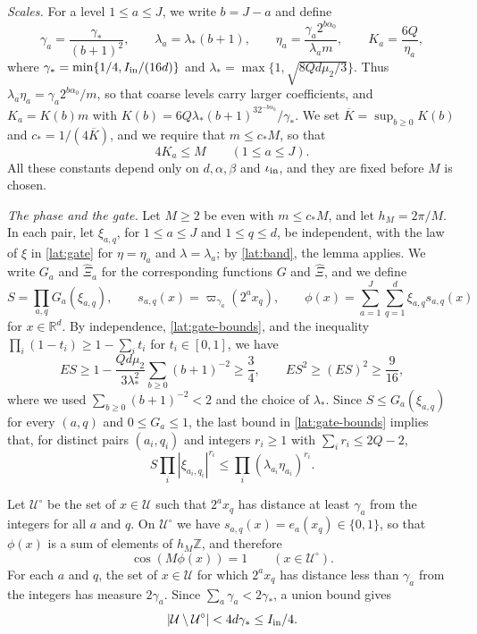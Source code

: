 \emph{Scales.} For a level $1\le a\le J$, we write $b=J-a$ and define
\[
 \gamma_a=\frac{\gamma_*}{(b+1)^2},\qquad
 \lambda_a=\lambda_*(b+1),\qquad
 \eta_a=\frac{\gamma_a2^{b\alpha_0}}{\lambda_am},\qquad
 K_a=\frac{6Q}{\eta_a},
\]
where $\gamma_*=\min\{1/4,I_{\rm in}/(16d)\}$ and
$\lambda_*=\max\{1,\sqrt{8Qd\mu_2/3}\}$. Thus
$\lambda_a\eta_a=\gamma_a2^{b\alpha_0}/m$, so that coarse levels carry
larger coefficients, and $K_a=K(b)m$ with
$K(b)=6Q\lambda_*(b+1)^32^{-b\alpha_0}/\gamma_*$. We set
$\overline K=\sup_{b\ge0}K(b)$ and $c_*=1/(4\overline K)$, and we
require that $m\le c_*M$, so that
\begin{equation}\label{lat:band}
 4K_a\le M\qquad(1\le a\le J).
\end{equation}
All these constants depend only on $d,\alpha,\beta$ and
$\iota_{\rm in}$, and they are fixed before $M$ is chosen.

\emph{The phase and the gate.} Let $M\ge2$ be even with $m\le c_*M$,
and let $h_M=2\pi/M$. In each pair, let $\xi_{a,q}$, for $1\le a\le J$
and $1\le q\le d$, be independent, with the law of $\xi$ in
\cref{lat:gate} for $\eta=\eta_a$ and $\lambda=\lambda_a$; by
\eqref{lat:band}, the lemma applies. We write $G_a$ and $\widehat\Xi_a$
for the corresponding functions $G$ and $\widehat\Xi$, and we define
\[
 S=\prod_{a,q}G_a(\xi_{a,q}),\qquad
 s_{a,q}(x)=\varpi_{\gamma_a}(2^ax_q),\qquad
 \phi(x)=\sum_{a=1}^J\sum_{q=1}^d\xi_{a,q}s_{a,q}(x)
\]
for $x\in\mathbb R^d$. By independence, \eqref{lat:gate-bounds}, and the
inequality $\prod_i(1-t_i)\ge1-\sum_it_i$ for $t_i\in[0,1]$, we have
\[
 ES\ge1-\frac{Qd\mu_2}{3\lambda_*^2}\sum_{b\ge0}(b+1)^{-2}\ge\frac34,
 \qquad ES^2\ge(ES)^2\ge\frac9{16},
\]
where we used $\sum_{b\ge0}(b+1)^{-2}<2$ and the choice of $\lambda_*$.
Since $S\le G_a(\xi_{a,q})$ for every $(a,q)$ and $0\le G_a\le1$, the
last bound in \eqref{lat:gate-bounds} implies that, for distinct pairs
$(a_i,q_i)$ and integers $r_i\ge1$ with $\sum_ir_i\le2Q-2$,
\begin{equation}\label{lat:gate-product}
 S\prod_i|\xi_{a_i,q_i}|^{r_i}
 \le\prod_i(\lambda_{a_i}\eta_{a_i})^{r_i}.
\end{equation}

Let $\mathcal U^\circ$ be the set of $x\in\mathcal U$ such that
$2^ax_q$ has distance at least $\gamma_a$ from the integers for all $a$
and $q$. On $\mathcal U^\circ$ we have $s_{a,q}(x)=e_a(x_q)\in\{0,1\}$,
so that $\phi(x)$ is a sum of elements of $h_M\mathbb Z$, and therefore
\begin{equation}\label{lat:coherence}
 \cos(M\phi(x))=1\qquad(x\in\mathcal U^\circ).
\end{equation}
For each $a$ and $q$, the set of $x\in\mathcal U$ for which $2^ax_q$ has
distance less than $\gamma_a$ from the integers has measure
$2\gamma_a$. Since $\sum_a\gamma_a<2\gamma_*$, a union bound gives
\begin{equation}\label{lat:collar}
 |\mathcal U\setminus\mathcal U^\circ|<4d\gamma_*\le I_{\rm in}/4 .
\end{equation}

